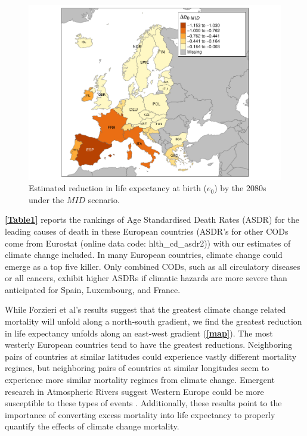 \documentclass[12pt,]{article}
\makeatletter
\def\maxwidth{\ifdim\Gin@nat@width>\linewidth\linewidth
\else\Gin@nat@width\fi}
\let\Oldincludegraphics\includegraphics
\renewcommand{\includegraphics}[1]{\Oldincludegraphics[width=\maxwidth]{#1}}
\makeatother
\begin{document}
\begin{figure}
\centering
\includegraphics{MS-cclifeexpec_files/figure-latex/figure2-1.pdf}
\caption{Estimated reduction in life expectancy at birth (\(e_0\)) by
the 2080s under the \(MID\) scenario.\label{map}}
\end{figure}

\textbf{\autoref{Table1}} reports the rankings of Age Standardised Death
Rates (ASDR) for the leading causes of death in these European countries
(ASDR's for other CODs come from Eurostat (online data code:
hlth\_cd\_asdr2)) with our estimates of climate change included. In many
European countries, climate change could emerge as a top five killer.
Only combined CODs, such as all circulatory diseases or all cancers,
exhibit higher ASDRs if climatic hazards are more severe than
anticipated for Spain, Luxembourg, and France.

While Forzieri et al's \citep{forzieri2017increasing} results suggest
that the greatest climate change related mortality will unfold along a
north-south gradient, we find the greatest reduction in life expectancy
unfolds along an east-west gradient (\textbf{\autoref{map}}). The most
westerly European countries tend to have the greatest reductions.
Neighboring pairs of countries at similar latitudes could experience
vastly different mortality regimes, but neighboring pairs of countries
at similar longitudes seem to experience more similar mortality regimes
from climate change. Emergent research in Atmospheric Rivers suggest
Western Europe could be more susceptible to these types of events
\citep{ramos2015daily}. Additionally, these results point to the
importance of converting excess mortality into life expectancy to
properly quantify the effects of climate change mortality.
\end{document}
